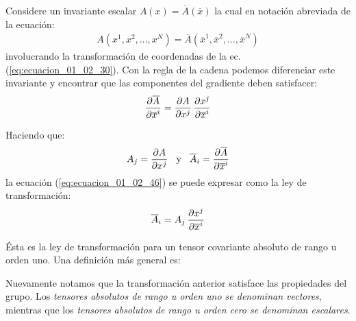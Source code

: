 \documentclass[hidelinks,12pt]{article}
\begin{document}
Considere un invariante escalar $A (x) = \overline{A} (\overline{x})$ la cual en notación abreviada de la ecuación:
\begin{align*}
A (x^{1}, x^{2}, \ldots, x^{N}) = \overline{A} (\overline{x}^{1}, \overline{x}^{2}, \ldots, \overline{x}^{N})
\end{align*}
involucrando la transformación de coordenadas de la ec. (\ref{eq:ecuacion_01_02_30}). Con la regla de la cadena podemos diferenciar este invariante y encontrar que las componentes del gradiente deben satisfacer:
\begin{align}
\pdv{\overline{A}}{\overline{x}^{i}} = \pdv{A}{x^{j}} \, \pdv{x^{j}}{\overline{x}^{i}}
\label{eq:ecuacion_01_02_46}
\end{align}

Haciendo que:
\begin{align*}
A_{j} = \pdv{A}{x^{j}} \hspace{0.3cm} \text{y} \hspace{0.3cm} \overline{A}_{i} = \pdv{\overline{A}}{\overline{x}^{i}}
\end{align*}
la ecuación (\ref{eq:ecuacion_01_02_46}) se puede expresar como la ley de transformación:
\begin{align}
\overline{A}_{i} = A_{j} \, \pdv{x^{j}}{\overline{x}^{i}}
\label{eq:ecuacion_01_02_47}
\end{align}

Ésta es la ley de transformación para un tensor covariante absoluto de rango u orden uno. Una definición más general es:
\begin{center}
    \noindent{}
\end{center}
\par
Nuevamente notamos que la transformación anterior satisface las propiedades del grupo. Los \emph{tensores absolutos de rango u orden uno se denominan vectores}, mientras que los \emph{tensores absolutos de rango u orden cero se denominan escalares}.
\end{document}
